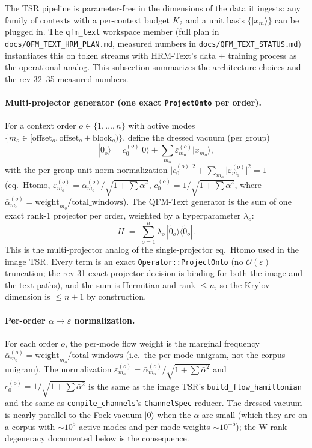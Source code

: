 \documentclass[11pt, a4paper]{article}
\begin{document}
The TSR pipeline is parameter-free in the dimensions of the data it
ingests: any family of contexts with a per-context budget $K_2$ and a
unit basis $\{|x_m\rangle\}$ can be plugged in. The
\texttt{qfm\_text} workspace member (full plan in
\texttt{docs/QFM\_TEXT\_HRM\_PLAN.md}, measured numbers in
\texttt{docs/QFM\_TEXT\_STATUS.md}) instantiates this on token
streams with HRM-Text's data + training process as the operational
analog. This subsection summarizes the architecture choices and the
rev 32--35 measured numbers.

\paragraph{Multi-projector generator (one exact
\texttt{ProjectOnto} per order).} For a context order
$o\in\{1,\ldots,n\}$ with active modes
$\{m_o\in[\mathrm{offset}_o,\mathrm{offset}_o+\mathrm{block}_o)\}$,
define the dressed vacuum (per group)
\begin{equation}
|\tilde 0_o\rangle = c_0^{(o)}|0\rangle + \sum_{m_o}\varepsilon_{m_o}^{(o)}|x_{m_o}\rangle,
\end{equation}
with the per-group unit-norm normalization
$\big|c_0^{(o)}\big|^2+\sum_{m_o}\big|\varepsilon_{m_o}^{(o)}\big|^2=1$
(eq.~Htomo, $\varepsilon_{m_o}^{(o)}=\bar\alpha_{m_o}^{(o)}/\sqrt{1+\sum\bar\alpha^2}$,
$c_0^{(o)}=1/\sqrt{1+\sum\bar\alpha^2}$, where
$\bar\alpha_{m_o}^{(o)}=\mathrm{weight}_{m_o}/\mathrm{total\_windows}$).
The QFM-Text generator is the sum of one exact rank-1 projector
per order, weighted by a hyperparameter $\lambda_o$:
\begin{equation}
H \;=\; \sum_{o=1}^{n} \lambda_o \,|\tilde 0_o\rangle\langle\tilde 0_o|.
\label{eq:Htomo_text}
\end{equation}
This is the multi-projector analog of the single-projector eq.~Htomo
used in the image TSR. Every term is an exact
\texttt{Operator::ProjectOnto} (no $\mathcal{O}(\varepsilon)$
truncation; the rev 31 exact-projector decision is binding for both
the image and the text paths), and the sum is Hermitian and rank
$\le n$, so the Krylov dimension is $\le n+1$ by construction.

\paragraph{Per-order $\alpha\to\varepsilon$ normalization.} For each
order $o$, the per-mode flow weight is the marginal frequency
$\bar\alpha_{m_o}^{(o)}=\mathrm{weight}_{m_o}/\mathrm{total\_windows}$
(i.e.\ the per-mode unigram, not the corpus unigram). The
normalization $\varepsilon_{m_o}^{(o)}=
\bar\alpha_{m_o}^{(o)}/\sqrt{1+\sum\bar\alpha^2}$ and
$c_0^{(o)}=1/\sqrt{1+\sum\bar\alpha^2}$ is the same as the image
TSR's \texttt{build\_flow\_hamiltonian} and the same as
\texttt{compile\_channels}'s \texttt{ChannelSpec} reducer. The
dressed vacuum is nearly parallel to the Fock vacuum $|0\rangle$
when the $\bar\alpha$ are small (which they are on a corpus with
$\sim10^5$ active modes and per-mode weights $\sim10^{-5}$); the
W-rank degeneracy documented below is the consequence.
\end{document}
